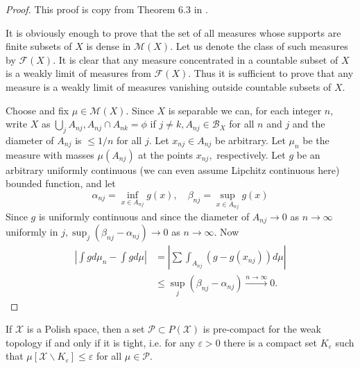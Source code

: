 \begin{proof}
	This proof is copy from Theorem 6.3 in \cite{parthasarathy2005probability}.

	It is obviously enough to prove that the set of all measures whose supports are finite subsets of \( X \) is dense in \( \mathscr { M } ( X ) . \) Let us denote the class of such measures by \( \mathscr { F } ( X ) . \) It is clear that any measure concentrated in a countable subset of \( X \) is a weakly limit of measures from \( \mathscr { F } ( X ) . \) Thus it is sufficient to prove that any measure is a weakly limit of measures vanishing outside countable subsets of \( X \).

	Choose and fix \( \mu \in \mathscr { M } ( X ) \). Since \( X \) is separable we can, for each integer \( n , \) write \( X \) as \( \bigcup _ { j } A _ { n j } , A _ { n j } \cap A _ { n k } = \phi \) if \( j \neq k , A _ { n j } \in \mathscr { B } _ { X } \) for all \( n \) and \( j \) and the diameter of \( A _ { n j } \) is \( \leq 1 / n \) for all \( j \). Let \( x _ { n j } \in A _ { n j } \) be arbitrary. Let \( \mu _ { n } \) be the measure with masses \( \mu \left( A _ { n j } \right) \) at the points \( x _ { n j } , \) respectively. Let $g$ be an arbitrary uniformly continuous (we can even assume Lipchitz continuous here) bounded function, and let \[ \alpha _ { n j } = \inf _ { x \in A _ { n j } } g ( x ) , \quad \beta _ { n j } = \sup _ { x \in A _ { n j } } g ( x ) \]
	Since \( g \) is uniformly continuous and since the diameter of \( A _ { n j } \rightarrow 0 \) as \( n \rightarrow \infty \) uniformly in \( j , \sup _ { j } \left( \beta _ { n j } - \alpha _ { n j } \right) \rightarrow 0 \) as \( n \rightarrow \infty \). Now
	\begin{align*}
		\left| \int g d \mu _ { n } - \int g d \mu \right| & = \left| \sum \int _ { A _ { n j } } \left( g - g \left( x _ { n j } \right) \right) d \mu \right|     \\
		                                                   & \leq \sup_{j} \left( \beta _ { n j } - \alpha _ { n j } \right) \xrightarrow{ n \rightarrow \infty} 0.
	\end{align*}
\end{proof}

\begin{thm}
	If \( \mathcal { X } \) is a Polish space, then a set \( \mathcal { P } \subset P ( \mathcal { X } ) \) is pre-compact for the weak topology if and only if it is tight, i.e. for any \( \varepsilon > 0 \) there is a compact set \( K _ { \varepsilon } \) such that \( \mu \left[ \mathcal { X } \backslash K _ { \varepsilon } \right] \leq \varepsilon \) for all \( \mu \in \mathcal { P } \).
\end{thm}

